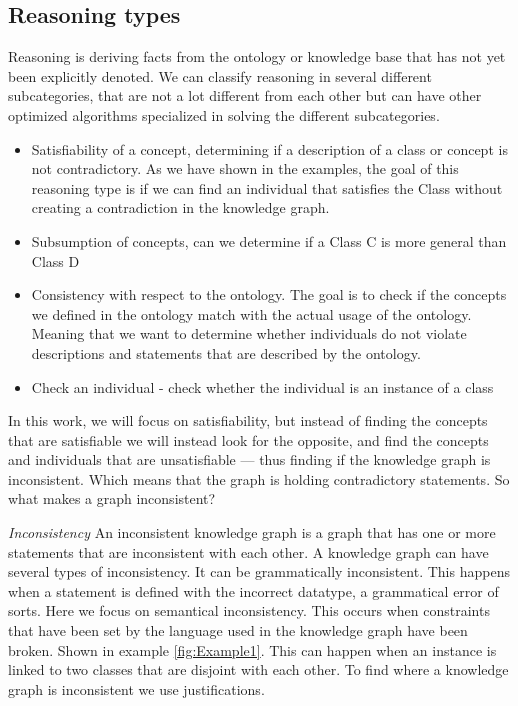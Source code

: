 \documentclass[11pt,letterpaper ,oneside ]{book}
\begin{document}
	\subsection{Reasoning types}
	Reasoning is deriving facts from the ontology or knowledge base that has not yet been explicitly denoted. We can classify reasoning in several different subcategories, that are not a lot different from each other but can have other optimized algorithms specialized in solving the different subcategories.
	\begin{itemize}
		\item Satisfiability of a concept, determining if a description of a class or concept is not contradictory. As we have shown in the examples, the goal of this reasoning type is if  we can find an individual that satisfies the Class without creating a contradiction in the knowledge graph. 
		\item Subsumption of concepts, can we determine if a Class C is more general than Class D
		\item Consistency with respect to the ontology. The goal is to check if the concepts we defined in the ontology match with the actual usage of the ontology. Meaning that we want to determine whether individuals do not violate descriptions and statements that are described by the ontology.
		\item Check an individual - check whether the individual is an instance of a class
	\end{itemize}
	In this work, we will focus on satisfiability, but instead of finding the concepts that are satisfiable we will instead look for the opposite, and find the concepts and individuals that are unsatisfiable — thus finding if the knowledge graph is inconsistent. Which means that the graph is holding contradictory statements. So what makes a graph inconsistent?
	
	\textit{Inconsistency} An inconsistent knowledge graph is a graph that has one or more statements that are inconsistent with each other. A knowledge graph can have several types of inconsistency. It can be grammatically inconsistent. This happens when a statement is defined with the incorrect datatype, a grammatical error of sorts. Here we focus on semantical inconsistency. This occurs when constraints that have been set by the language used in the knowledge graph have been broken. Shown in example \ref{fig:Example1}. This can happen when an instance is linked to two classes that are disjoint with each other. To find where a knowledge graph is inconsistent we use justifications.   
	
\end{document}
